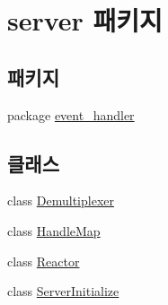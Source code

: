\hypertarget{namespaceserver}{\section{server 패키지}
\label{namespaceserver}
}
\subsection*{패키지}
\begin{DoxyCompactItemize}
\item 
package \hyperlink{namespaceserver_1_1event__handler}{event\-\_\-handler}
\end{DoxyCompactItemize}
\subsection*{클래스}
\begin{DoxyCompactItemize}
\item 
class \hyperlink{classserver_1_1_demultiplexer}{Demultiplexer}
\item 
class \hyperlink{classserver_1_1_handle_map}{Handle\-Map}
\item 
class \hyperlink{classserver_1_1_reactor}{Reactor}
\item 
class \hyperlink{classserver_1_1_server_initialize}{Server\-Initialize}
\end{DoxyCompactItemize}
